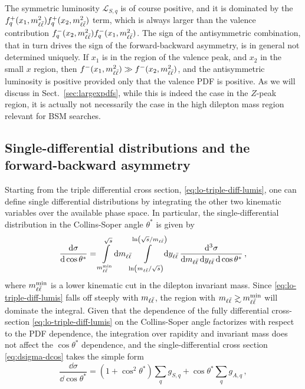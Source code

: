 The symmetric luminosity $\mathcal{L}_{S,q}$ is of course positive,
and it is
dominated by the $f_q^+(x_1,m_{\ell\bar{\ell}}^2) f_{q}^+(x_2,m_{\ell\bar{\ell}}^2)$ term, which
is always larger than the valence contribution 
$f_q^-(x_2,m_{\ell\bar{\ell}}^2) f_{q}^-(x_1,m_{\ell\bar{\ell}}^2)$.
The sign of the antisymmetric combination, that in turn
drives the sign of the
forward-backward asymmetry, is in general not determined
uniquely.
%
If $x_1$ is in the region of the valence peak, and $x_2$ in
the small $x$ region, then $f^-(x_1,m_{\ell\bar{\ell}}^2)\gg f^-(x_2,m_{\ell\bar{\ell}}^2)$, and the
antisymmetric luminosity is positive provided only that the valence PDF is positive.
%
As we will discuss in Sect.~\ref{sec:largexpdfs},
while this is indeed the case in
the $Z$-peak region, it is actually not necessarily the case in the
high dilepton mass region relevant for BSM searches.

\subsection{Single-differential distributions and the forward-backward asymmetry}
\label{sec:numlo}
Starting from the triple differential cross section,
\cref{eq:lo-triple-diff-lumis}, one can define 
single differential distributions by integrating the other two kinematic variables
over the available phase space.
%
In particular, the single-differential distribution in the
Collins-Soper angle $\theta^*$ is given by
\begin{equation}
  \label{eq:dsigma-dcos}
  \frac{\dd\sigma}{\dd\cos\theta^*} = \int\limits_{m_{\ell\bar{\ell}}^{\text{min}}}^{\sqrt s}\!\dd m_{\ell\bar{\ell}}\!\!\int\limits_{\ln(m_{\ell\bar{\ell}}/\sqrt s)}^{\ln(\sqrt s/m_{\ell\bar{\ell}})}\!\!\dd y_{\ell\bar{\ell}}\, \frac{\dd^3 \sigma}{\dd m_{\ell\bar{\ell}} \, \dd y_{\ell\bar{\ell}} \, \dd\cos\theta^*} \, ,
\end{equation}
where $m_{\ell\bar{\ell}}^{\text{min}}$ is a lower kinematic cut in the dilepton invariant mass.
%
Since \cref{eq:lo-triple-diff-lumis} falls off steeply with $m_{\ell\bar{\ell}}$, the region
with $\mll \gsim \mll^{\text{min}}$ will dominate the integral.
%
Given that the dependence of the fully differential cross-section
\cref{eq:lo-triple-diff-lumis}
on  the Collins-Soper angle factorizes with respect to the PDF
dependence, the integration over rapidity and invariant mass does not
affect the  $\cos\theta^*$ dependence, and the single-differential
cross section \cref{eq:dsigma-dcos} takes the simple form 
\begin{equation}
  \label{eq:dsigma-dcos-v2}
  \frac{\dd\sigma}{\dd\cos\theta^*} = (1+\cos^2\theta^*)\sum_q g_{S,q} + \cos\theta^*\sum_q g_{A,q} \, ,
\end{equation}
